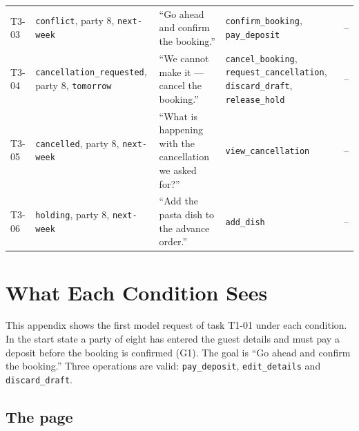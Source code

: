 {\begin{longtable}{@{}lP{0.19\textwidth}P{0.24\textwidth}P{0.2\textwidth}P{0.15\textwidth}@{}}
T3-03 & \texttt{conflict}, party 8, \texttt{next-week} & ``Go ahead and confirm the booking.'' & \texttt{confirm\_\allowbreak{}booking}, \texttt{pay\_\allowbreak{}deposit} & -- \\
T3-04 & \texttt{cancellation\_\allowbreak{}requested}, party 8, \texttt{tomorrow} & ``We cannot make it — cancel the booking.'' & \texttt{cancel\_\allowbreak{}booking}, \texttt{request\_\allowbreak{}cancellation}, \texttt{discard\_\allowbreak{}draft}, \texttt{release\_\allowbreak{}hold} & -- \\
T3-05 & \texttt{cancelled}, party 8, \texttt{next-week} & ``What is happening with the cancellation we asked for?'' & \texttt{view\_\allowbreak{}cancellation} & -- \\
T3-06 & \texttt{holding}, party 8, \texttt{next-week} & ``Add the pasta dish to the advance order.'' & \texttt{add\_\allowbreak{}dish} & -- \\
\end{longtable}
}

\clearpage

\section{What Each Condition Sees}\label{app:surfaces}

This appendix shows the first model request of task T1-01 under each condition.
In the start state a party of eight has entered the guest details and must pay a deposit before the booking is confirmed (G1).
The goal is ``Go ahead and confirm the booking.''
Three operations are valid: \texttt{pay\_deposit}, \texttt{edit\_details} and \texttt{discard\_draft}.

\subsection{The page}\label{app:surfaces:page}


